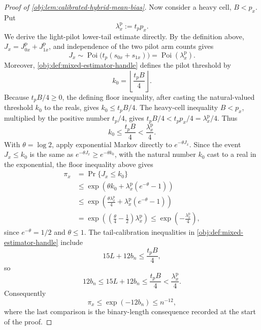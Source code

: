\documentclass[11pt]{article}
\begin{document}
\begin{proof}[Proof of \cref{obj:lem:calibrated-hybrid-mean-bias}]
Now consider a heavy cell, \(B<p_x\).  Put
\[
\lambda_x^{\mathrm p}:=t_p p_x.
\]
We derive the light-pilot lower-tail estimate directly.  By the definition above, \(J_x=J_{0x}^{\mathrm p}+J_{1x}^{\mathrm p}\), and independence of the two pilot arm counts gives
\[
J_x\sim\operatorname{Poi}\bigl(t_p(s_{0x}+s_{1x})\bigr)
=
\operatorname{Poi}(\lambda_x^{\mathrm p}).
\]
Moreover, \cref{obj:def:mixed-estimator-handle} defines the pilot threshold by
\[
k_0=\left\lfloor\frac{t_pB}{4}\right\rfloor.
\]
Because \(t_pB/4\ge0\), the defining floor inequality, after casting the
natural-valued threshold \(k_0\) to the reals, gives \(k_0\le t_pB/4\).
The heavy-cell inequality \(B<p_x\), multiplied by the positive number
\(t_p/4\), gives \(t_pB/4< t_pp_x/4=\lambda_x^{\mathrm p}/4\).  Thus
\[
k_0\le \frac{t_pB}{4}<\frac{\lambda_x^{\mathrm p}}4.
\]
With \(\theta=\log 2\), apply exponential Markov directly to
\(e^{-\theta J_x}\).  Since the event \(J_x\le k_0\) is the same as
\(e^{-\theta J_x}\ge e^{-\theta k_0}\), with the natural number \(k_0\)
cast to a real in the exponential, the floor inequality above gives
\[
\begin{aligned}
\pi_x
&=\Pr\{J_x\le k_0\} \\
&\le
\exp\!\left(\theta k_0
+\lambda_x^{\mathrm p}(e^{-\theta}-1)\right) \\
&\le
\exp\!\left(\frac{\theta\lambda_x^{\mathrm p}}4
+\lambda_x^{\mathrm p}(e^{-\theta}-1)\right) \\
&=
\exp\!\left(\left(\frac{\theta}{4}-\frac12\right)\lambda_x^{\mathrm p}\right)
\le
\exp\!\left(-\frac{\lambda_x^{\mathrm p}}4\right),
\end{aligned}
\]
since \(e^{-\theta}=1/2\) and \(\theta\le1\).  The tail-calibration inequalities in \cref{obj:def:mixed-estimator-handle} include
\[
15L+12b_n\le \frac{t_pB}{4},
\]
so
\[
12b_n\le 15L+12b_n\le \frac{t_pB}{4}<\frac{\lambda_x^{\mathrm p}}4.
\]
Consequently
\[
\pi_x\le \exp(-12b_n)\le n^{-12},
\]
where the last comparison is the binary-length consequence recorded at the start of the proof. %


\end{proof}
\end{document}
